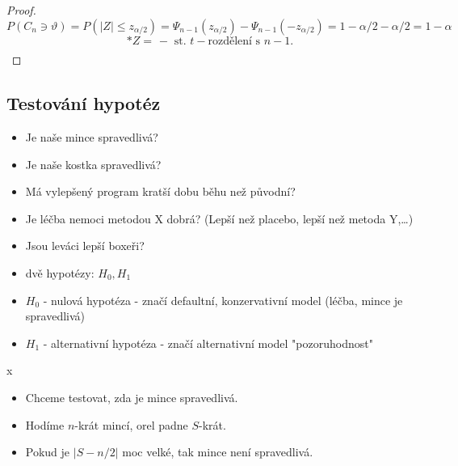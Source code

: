 \documentclass[../main.tex]{subfiles}
\begin{document}
\begin{proof}
    \[P(C_n \ni \vartheta) = P (|Z| \leq z_{\alpha/2}) = \Psi_{n-1}(z_{\alpha/2}) - \Psi_{n-1}(-z_{\alpha/2}) = 1 - \alpha/2 - \alpha/2 = 1-\alpha\]
    \[* Z = \frac{}{} - \text{ st. } t-\text{rozdělení s } n-1.\]
\end{proof}

\subsection{Testování hypotéz}
\begin{itemize}
    \item Je naše mince spravedlivá?
    \item Je naše kostka spravedlivá?
    \item Má vylepšený program kratší dobu běhu než původní?
    \item Je léčba nemoci metodou X dobrá? (Lepší než placebo, lepší než metoda Y,\dots)
    \item Jsou leváci lepší boxeři?
\end{itemize}
\begin{itemize}
    \item dvě hypotézy: $H_0,H_1$
    \item $H_0$ - nulová hypotéza - značí defaultní, konzervativní model (léčba, mince je spravedlivá)
    \item $H_1$ - alternativní hypotéza - značí alternativní model "pozoruhodnost"
\end{itemize}
\begin{example}
    {\color{white} x}
    \begin{itemize}
        \item Chceme testovat, zda je mince spravedlivá.
        \item Hodíme $n$-krát mincí, orel padne $S$-krát.
        \item Pokud je $|S-n/2|$ moc velké, tak mince není spravedlivá.
    \end{itemize}
\end{example}
\end{document}
